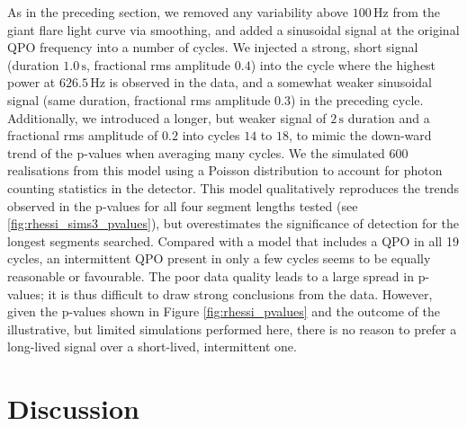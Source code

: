 \documentclass{emulateapj}
\begin{document}
As in the preceding section, we removed any variability above $100 \,\mathrm{Hz}$ from the \rhessi giant flare light curve via smoothing, and added a sinusoidal signal at the original QPO frequency into a number of cycles.
We injected a strong, short signal (duration $1.0 \,\mathrm{s}$, fractional rms amplitude $0.4$) into the cycle where the highest power at $626.5 \,\mathrm{Hz}$ is observed in the \rhessi data, and a somewhat weaker sinusoidal signal (same duration, fractional rms amplitude $0.3$) in the preceding cycle.
Additionally, we introduced a longer, but weaker signal of $2\,\mathrm{s}$ duration and a fractional rms amplitude of $0.2$ into cycles $14$ to $18$, to mimic the down-ward trend of the p-values when averaging many cycles. We the simulated $600$ realisations from this model using a Poisson distribution to account for photon counting statistics in the detector.
This model qualitatively reproduces the trends observed in the p-values for all four segment lengths tested (see \ref{fig:rhessi_sims3_pvalues}), but overestimates the significance of detection for the longest segments searched. Compared with a model that includes a QPO in all 19 cycles, an intermittent QPO present in only a few cycles seems to be equally reasonable or favourable. The poor data quality leads to a large spread in p-values; it is thus difficult to draw strong conclusions from the data. However, given the p-values shown in Figure \ref{fig:rhessi_pvalues} and the outcome of the illustrative, but limited simulations performed here, there is no reason to prefer a long-lived signal over a short-lived, intermittent one.


\section{Discussion}
\label{sec:discussion}
\end{document}
